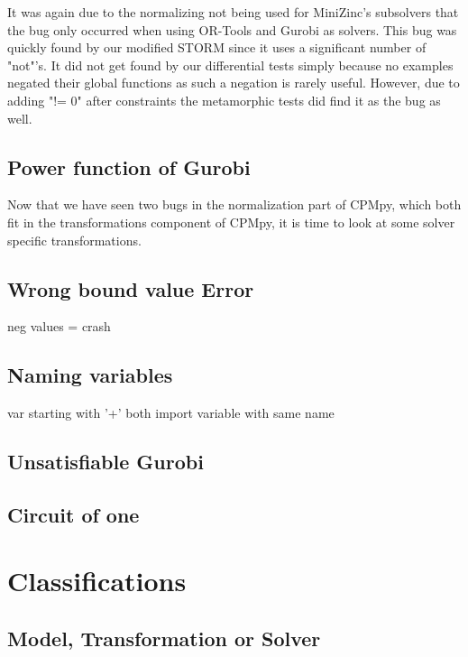 It was again due to the normalizing not being used for MiniZinc's subsolvers that the bug only occurred when using OR-Tools and Gurobi as solvers. This bug was quickly found by our modified STORM since it uses a significant number of "not"'s. It did not get found by our differential tests simply because no examples negated their global functions as such a negation is rarely useful. However, due to adding "!= 0" after constraints the metamorphic tests did find it as the bug as well.

\subsection{Power function of Gurobi}
\label{res:bug:Power}
Now that we have seen two bugs in the normalization part of CPMpy, which both fit in the transformations component of CPMpy, it is time to look at some solver specific transformations. 

\subsection{Wrong bound value Error}
\label{res:bug:WrongBounds}

neg values = crash
\subsection{Naming variables}
\label{res:bug:Naming+andImport}
var starting with '+' both import variable with same name
\subsection{Unsatisfiable Gurobi}
\label{res:bug:UnsatGurobu}

\subsection{Circuit of one}
\label{res:bug:Circuit}


\section{Classifications}
\subsection{Model, Transformation or Solver}

